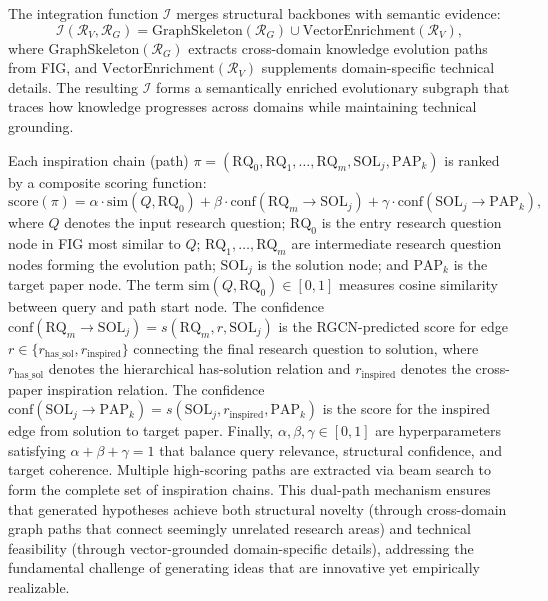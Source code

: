 \documentclass[runningheads]{llncs}
\begin{document}
The integration function $\mathcal{I}$ merges structural backbones with semantic evidence:
\begin{equation}
    \mathcal{I}(\mathcal{R}_V, \mathcal{R}_G) = \text{GraphSkeleton}(\mathcal{R}_G) \cup \text{VectorEnrichment}(\mathcal{R}_V),
\end{equation}
where $\text{GraphSkeleton}(\mathcal{R}_G)$ extracts cross-domain knowledge evolution paths from FIG, and $\text{VectorEnrichment}(\mathcal{R}_V)$ supplements domain-specific technical details. The resulting $\mathcal{I}$ forms a semantically enriched evolutionary subgraph that traces how knowledge progresses across domains while maintaining technical grounding.

Each inspiration chain (path) $\pi = (\text{RQ}_0, \text{RQ}_1, \ldots, \text{RQ}_m, \text{SOL}_j, \text{PAP}_k)$ is ranked by a composite scoring function:
\begin{equation}
    \text{score}(\pi) = \alpha \cdot \text{sim}(Q, \text{RQ}_0) + \beta \cdot \text{conf}(\text{RQ}_m \rightarrow \text{SOL}_j) + \gamma \cdot \text{conf}(\text{SOL}_j \rightarrow \text{PAP}_k),
\end{equation}
where $Q$ denotes the input research question; $\text{RQ}_0$ is the entry research question node in FIG most similar to $Q$; $\text{RQ}_1, \ldots, \text{RQ}_m$ are intermediate research question nodes forming the evolution path; $\text{SOL}_j$ is the solution node; and $\text{PAP}_k$ is the target paper node. The term $\text{sim}(Q, \text{RQ}_0) \in [0, 1]$ measures cosine similarity between query and path start node. The confidence $\text{conf}(\text{RQ}_m \rightarrow \text{SOL}_j) = s(\text{RQ}_m, r, \text{SOL}_j)$ is the RGCN-predicted score for edge $r \in \{r_{\text{has\_sol}}, r_{\text{inspired}}\}$ connecting the final research question to solution, where $r_{\text{has\_sol}}$ denotes the hierarchical has-solution relation and $r_{\text{inspired}}$ denotes the cross-paper inspiration relation. The confidence $\text{conf}(\text{SOL}_j \rightarrow \text{PAP}_k) = s(\text{SOL}_j, r_{\text{inspired}}, \text{PAP}_k)$ is the score for the inspired edge from solution to target paper. Finally, $\alpha, \beta, \gamma \in [0, 1]$ are hyperparameters satisfying $\alpha + \beta + \gamma = 1$ that balance query relevance, structural confidence, and target coherence. Multiple high-scoring paths are extracted via beam search to form the complete set of inspiration chains. This dual-path mechanism ensures that generated hypotheses achieve both structural novelty (through cross-domain graph paths that connect seemingly unrelated research areas) and technical feasibility (through vector-grounded domain-specific details), addressing the fundamental challenge of generating ideas that are innovative yet empirically realizable.
\end{document}
